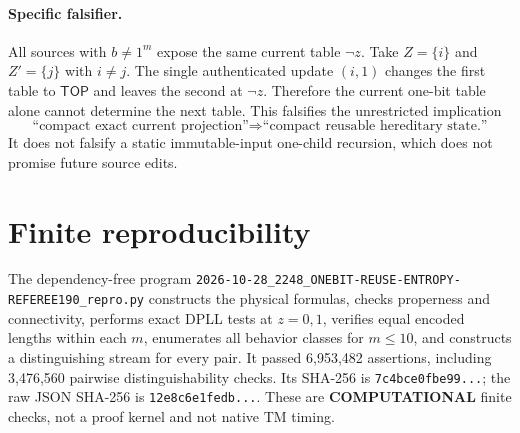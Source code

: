 \documentclass[11pt]{article}
\newcommand{\TOP}{\mathsf{TOP}}
\begin{document}
\paragraph{Specific falsifier.}
All sources with $b\ne1^m$ expose the same current table $\neg z$.  Take $Z=\{i\}$ and $Z'=\{j\}$ with $i\ne j$.  The single authenticated update $(i,1)$ changes the first table to $\TOP$ and leaves the second at $\neg z$.  Therefore the current one-bit table alone cannot determine the next table.  This falsifies the unrestricted implication
\[
 \text{``compact exact current projection''}
 \Longrightarrow
 \text{``compact reusable hereditary state.''}
\]
It does not falsify a static immutable-input one-child recursion, which does not promise future source edits.

\section{Finite reproducibility}
The dependency-free program
\texttt{2026-10-28\_2248\_ONEBIT-REUSE-ENTROPY-REFEREE190\_repro.py}
constructs the physical formulas, checks properness and connectivity, performs exact DPLL tests at $z=0,1$, verifies equal encoded lengths within each $m$, enumerates all behavior classes for $m\le10$, and constructs a distinguishing stream for every pair.  It passed 6,953,482 assertions, including 3,476,560 pairwise distinguishability checks.  Its SHA-256 is \texttt{7c4bce0fbe99...}; the raw JSON SHA-256 is \texttt{12e8c6e1fedb...}.  These are \textbf{COMPUTATIONAL} finite checks, not a proof kernel and not native TM timing.
\end{document}
